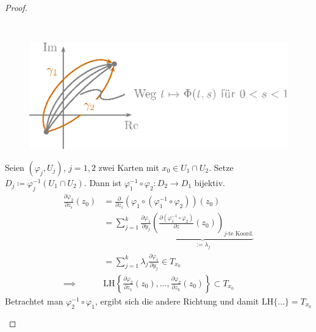 \documentclass[a4paper,10pt]{scrbook}
\begin{document}
\begin{theorem}[Satz]
\begin{proof}
\begin{enum-alph}
      \item ~
      \begin{figure}[H]
        \centering
        \includegraphics[scale=0.2]{images/ana3-tmp-74}
      \end{figure}
      Seien $(\varphi_j,U_j)$, $j=1,2$ zwei Karten mit $x_0 \in U_1 \cap U_2$. Setze $D_j \coloneq \varphi_j^{-1}(U_1 \cap U_2)$. Dann ist $\varphi_1^{-1} \circ \varphi_2 : D_2 \to D_1$ bijektiv.
      \begin{align*}
        \frac{\partial \varphi_2}{\partial z_i}(z_0) &= \frac{\partial}{\partial z_i} \left( \varphi_1 \circ \left( \varphi_1^{-1} \circ \varphi_2 \right) \right)(z_0) \\
        &= \sum\limits_{j=1}^{k} \frac{\partial \varphi_1}{\partial y_j} \underbrace{\left( \frac{\partial \left( \varphi_1^{-1} \circ \varphi_2 \right)}{\partial z}(z_0) \right)_{\text{$j$-te Koord.}}}_{:= \lambda_j} \\
        &= \sum_{j=1}^k \lambda_j \frac{\partial \varphi_1}{\partial y_j} \in T_{x_0} \\
        \implies& \mathrm{LH} \left\{ \frac{\partial \varphi_2}{\partial z_1} (z_0) , \ldots , \frac{\partial \varphi_2}{\partial z_k} (z_0) \right\} \subset T_{x_0}
      \end{align*}
      Betrachtet man $\varphi_2^{-1} \circ \varphi_1$, ergibt sich die andere Richtung und damit $\mathrm{LH} \{ \ldots \} = T_{x_0}$
    \end{enum-alph}
  \end{proof}
\end{theorem}
\end{document}
